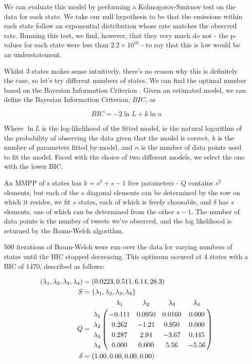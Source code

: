 We can evaluate this model by performing a Kolmogorov-Smirnov test on the data for each state. We take our null hypothesis to be that the emissions within each state follow an exponential distribution whose rate matches the observed rate. Running this test, we find, however, that they very much do not - the p-values for each state were less than $2.2 \times 10^{16}$ - to say that this is low would be an understatement.

Whilst 3 states makes sense intuitively, there's no reason why this is definitely the case, so let's try different numbers of states. We can find the optimal number based on the Bayesian Information Criterion \cite{bic}. Given an estimated model, we can define the Bayesian Information Criterion, $BIC$, as

$$
BIC = -2 \ln L + k \ln n
$$

Where $\ln L$ is the log-likelihood of the fitted model, ie the natural logarithm of the probability of observing the data given that the model is correct, $k$ is the number of parameters fitted by model, and $n$ is the number of data points used to fit the model. Faced with the choice of two different models, we select the one with the lower BIC.

An MMPP of $s$ states has $k=s^2+s-1$ free parameters - $Q$ contains $s^2$ elements, but each of the $s$ diagonal elements can be determined by the row on which it resides, we fit $s$ states, each of which is freely choosable, and $\delta$ has $s$ elements, one of which can be determined from the other $s-1$. The number of data points is the number of tweets we've observed, and the log likelihood is returned by the Baum-Welch algorithm.

500 iterations of Baum-Welch were run over the data for varying numbers of states until the BIC stopped decreasing. This optimum occured at 4 states with a BIC of 1470, described as follows:

\begin{align*}
(\lambda_1,\lambda_2,\lambda_3,\lambda_4) &= (0.0223,0.511,6.14,28.3)\\
S &= \{\lambda_1,\lambda_2,\lambda_3,\lambda_4\}\\
Q &= \bordermatrix{      & \lambda_1 & \lambda_2 & \lambda_3 & \lambda_4\cr
                \lambda_1 & -0.111 & 0.0950 & 0.0160 & 0.000 \cr
                \lambda_2 & 0.262  & -1.21  & 0.950  & 0.000 \cr
                \lambda_3 & 0.287  & 2.94   & -3.67  & 0.445 \cr
                \lambda_4 & 0.000  & 0.000  & 5.56   & -5.56 \cr
			}\\
\delta &= (1.00,0.00,0.00,0.00)
\end{align*}

